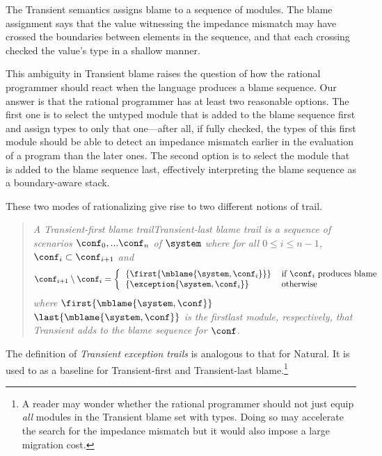 
The Transient semantics assigns blame to a sequence of modules. The blame
assignment says that the value witnessing the impedance mismatch may have
crossed the boundaries between elements in the sequence, and that each crossing
checked the value's type in a shallow manner.

This ambiguity in Transient blame raises the question of how the rational
programmer should react when the language produces a blame sequence. Our answer
is that the rational programmer has at least two reasonable options. The first
one is to select the untyped module that is added to the blame sequence first and
assign types to only that one---after all, if fully checked, the types of this
first module should be able to detect an impedance mismatch earlier in the
evaluation of a program than the later ones. The second option is to select the
module that is added to the blame sequence last, effectively interpreting the
blame sequence as a boundary-aware stack.

These two modes of rationalizing give rise to two different notions of trail.

\begin{quote}
\it A \emph{Transient-first blame trail}{\lrdef}\emph{Transient-last blame trail} is a sequence of scenarios
$\conf_0,...\conf_n$ of $\system$ where for all $0 \leq i \leq n - 1$,
$\conf_i \subset \conf_{i+1}$ and
\[ \conf_{i+1} \setminus \conf_i = %
\left\{ %
\begin{tabular}{ll} %
$\{\first{\mblame{\system, \conf_i}}\}$  & if $\conf_i$ produces blame \\ %
$\{\exception{\system, \conf_i}\}$     & otherwise \\ %
\end{tabular} \right. %
\]
where $\first{\mblame{\system, \conf}}${\lrdef}$\last{\mblame{\system, \conf}}$ is the
first{\lrdef}last module, respectively,  that Transient adds to the blame sequence for $\conf$.
\end{quote}

The definition of \emph{Transient exception trails} is analogous to that for
Natural. It is used to as a baseline for Transient-first and Transient-last
blame.\footnote{A reader may wonder whether the rational programmer
should not just equip {\em all\/} modules in the Transient blame set
with types. Doing so may accelerate the search for the impedance
mismatch but it would also impose a large migration cost.}
